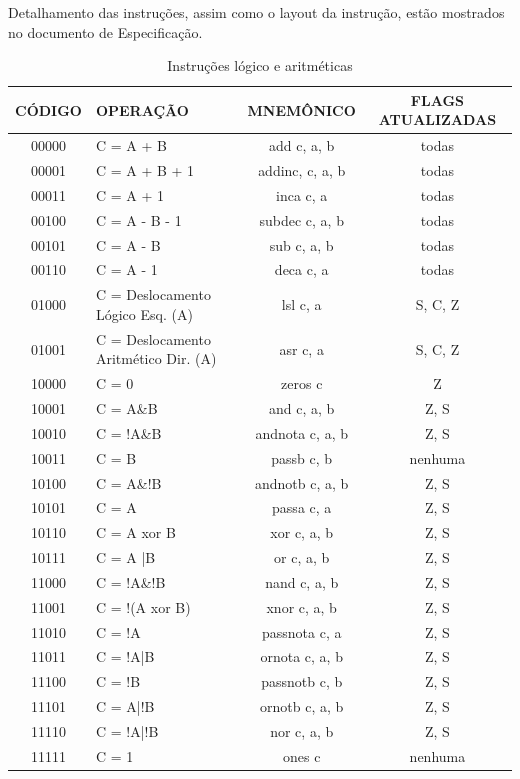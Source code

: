 \documentclass{article}
\begin{document}
    Detalhamento das instruções, assim como o layout da instrução, estão mostrados no documento de Especificação.
    \newpage
	\begin{table}[H]
	\centering
	\begin{tabular}{|c|m{6cm}|c|c|}
  	\hline 
  	\textbf{CÓDIGO} & \textbf{OPERAÇÃO} & \textbf{MNEMÔNICO} & \textbf{FLAGS ATUALIZADAS} \\ 
  	\hline   	
  	00000 & C = A + B & add c, a, b & todas \\ \hline
  	00001 & C = A + B + 1 & addinc, c, a, b & todas \\ \hline
  	00011 & C = A + 1 & inca c, a & todas \\ \hline
  	00100 & C = A - B - 1 & subdec c, a, b & todas \\ \hline
  	00101 & C = A - B & sub c, a, b & todas \\ \hline
  	00110  & C = A - 1 & deca c, a & todas \\ \hline
  	01000 & C = Deslocamento Lógico Esq. (A) & lsl c, a & S, C, Z \\ \hline
  	01001 & C = Deslocamento Aritmético Dir. (A) & asr c, a & S, C, Z \\ \hline
  	10000 & C = 0 & zeros c & Z \\ \hline
    10001 & C = A\&B & and c, a, b & Z, S \\ \hline
    10010 & C = !A\&B & andnota c, a, b & Z, S \\ \hline
    10011 & C = B & passb c, b & nenhuma \\ \hline
    10100 & C = A\&!B & andnotb c, a, b & Z, S \\ \hline
    10101 & C = A & passa c, a & Z, S \\ \hline
    10110 & C = A xor B & xor c, a, b & Z, S \\ \hline
    10111 & C = A |B & or c, a, b & Z, S \\ \hline
    11000 & C = !A\&!B & nand c, a, b & Z, S \\ \hline
    11001 & C = !(A xor B) & xnor c, a, b & Z, S \\ \hline
    11010 & C = !A & passnota c, a & Z, S \\ \hline
    11011 & C = !A|B & ornota c, a, b & Z, S \\ \hline
    11100 & C = !B & passnotb c, b & Z, S \\ \hline
    11101 & C = A|!B & ornotb c, a, b & Z, S \\ \hline
    11110 & C = !A|!B & nor c, a, b & Z, S \\ \hline
    11111 & C = 1 & ones c & nenhuma \\ \hline
  	\end{tabular} 
  	\caption{Instruções lógico e aritméticas}
  \end{table}
  \newpage    
\end{document}
